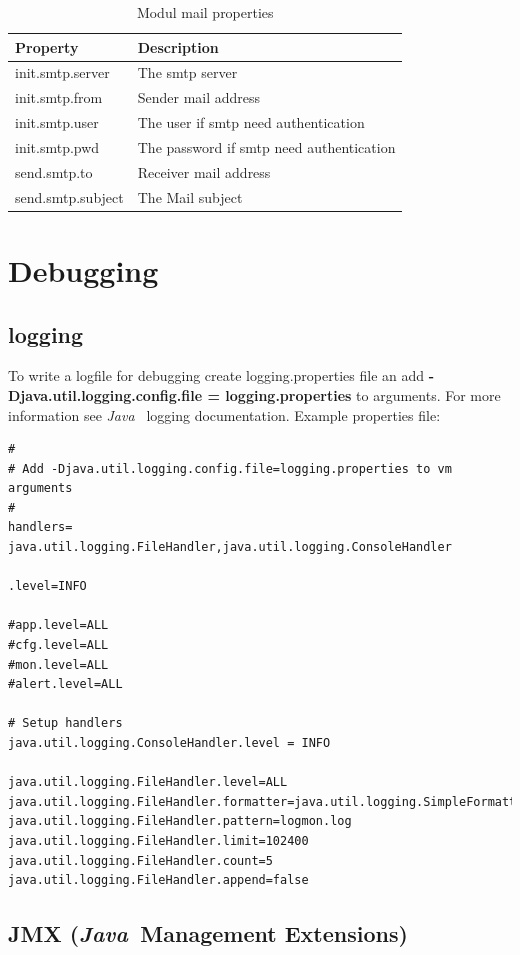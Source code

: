 \documentclass[11pt,a4paper]{article}
\newcommand{\java}{\textit{Java\ }}
\begin{document}
\begin{table}[ht]
\begin{tabular}{l|p{}}
  Property 		    & Description\\\hline
  init.smtp.server 	& The smtp server\\
  init.smtp.from    & Sender mail address\\
  init.smtp.user 	& The user if smtp need authentication\\
  init.smtp.pwd 	& The password if smtp need authentication\\
  send.smtp.to 		& Receiver mail address\\
  send.smtp.subject & The Mail subject\\
\end{tabular}
\caption{Modul mail properties}
\end{table}

\section{Debugging}

\subsection{logging}

To write a logfile for debugging create logging.properties file an add
\textbf{-Djava.util.logging.config.file = logging.properties} to arguments.
For more information see \java
logging documentation. Example properties file:

\begin{verbatim}
#
# Add -Djava.util.logging.config.file=logging.properties to vm arguments
#
handlers= java.util.logging.FileHandler,java.util.logging.ConsoleHandler

.level=INFO

#app.level=ALL
#cfg.level=ALL
#mon.level=ALL
#alert.level=ALL

# Setup handlers
java.util.logging.ConsoleHandler.level = INFO

java.util.logging.FileHandler.level=ALL
java.util.logging.FileHandler.formatter=java.util.logging.SimpleFormatter
java.util.logging.FileHandler.pattern=logmon.log
java.util.logging.FileHandler.limit=102400
java.util.logging.FileHandler.count=5
java.util.logging.FileHandler.append=false

\end{verbatim}

\subsection{JMX (\java Management Extensions)}
\end{document}
